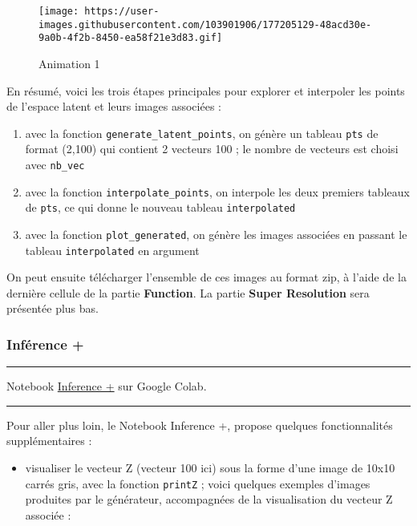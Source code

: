 \documentclass[
]{article}
\providecommand{\tightlist}{%
  \setlength{\itemsep}{0pt}\setlength{\parskip}{0pt}}
\begin{document}
\begin{figure}
\centering
\texttt{[image: https://user-images.githubusercontent.com/103901906/177205129-48acd30e-9a0b-4f2b-8450-ea58f21e3d83.gif]}
\caption{Animation 1}
\end{figure}

En résumé, voici les trois étapes principales pour explorer et interpoler les points de l'espace latent et leurs images associées :

\begin{enumerate}
\def\labelenumi{\arabic{enumi}.}
\tightlist
\item
  avec la fonction \texttt{generate\_latent\_points}, on génère un tableau \texttt{pts} de format (2,100) qui contient 2 vecteurs 100 ; le nombre de vecteurs est choisi avec \texttt{nb\_vec}
\item
  avec la fonction \texttt{interpolate\_points}, on interpole les deux premiers tableaux de \texttt{pts}, ce qui donne le nouveau tableau \texttt{interpolated}
\item
  avec la fonction \texttt{plot\_generated}, on génère les images associées en passant le tableau \texttt{interpolated} en argument
\end{enumerate}

On peut ensuite télécharger l'ensemble de ces images au format zip, à l'aide de la dernière cellule de la partie \textbf{Function}. La partie \textbf{Super Resolution} sera présentée plus bas.

\hypertarget{infuxe9rence-1}{%
\subsubsection{Inférence +}\label{infuxe9rence-1}}

\begin{center}\rule{0.5\linewidth}{0.5pt}\end{center}

Notebook \href{https://colab.research.google.com/drive/14oww73GEQrECNtgaj8iK78jSw8GtHIiE?usp=sharing}{Inference +} sur Google Colab.

\begin{center}\rule{0.5\linewidth}{0.5pt}\end{center}

Pour aller plus loin, le Notebook Inference +, propose quelques fonctionnalités supplémentaires :

\begin{itemize}
\tightlist
\item
  visualiser le vecteur Z (vecteur 100 ici) sous la forme d'une image de 10x10 carrés gris, avec la fonction \texttt{printZ} ; voici quelques exemples d'images produites par le générateur, accompagnées de la visualisation du vecteur Z associée :
\end{itemize}
\end{document}
